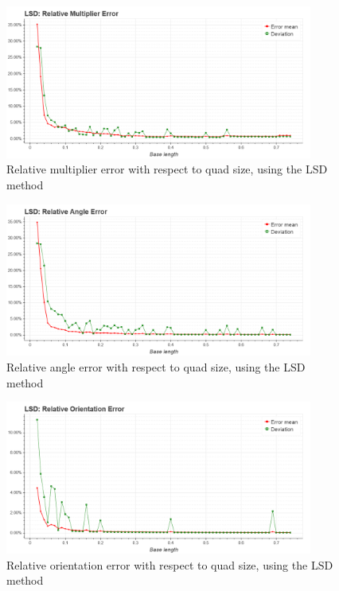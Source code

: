 \begin{figure}[p]
	\centering
	\includegraphics[width=0.9\textwidth]{figures/plots/lsd_relative_multiplier_error.png}
	\caption{Relative multiplier error with respect to quad size, using the LSD method}
	\label{fig:lsdRelMulErr}
\end{figure}
\begin{figure}[p]
	\centering
	\includegraphics[width=0.9\textwidth]{figures/plots/lsd_relative_angle_error.png}
	\caption{Relative angle error with respect to quad size, using the LSD method}
	\label{fig:lsdRelAngleErr}
\end{figure}
\begin{figure}[p]
	\centering
	\includegraphics[width=0.9\textwidth]{figures/plots/lsd_relative_orientation_error.png}
	\caption{Relative orientation error with respect to quad size, using the LSD method}
	\label{fig:lsdRelOrientErr}
\end{figure}

